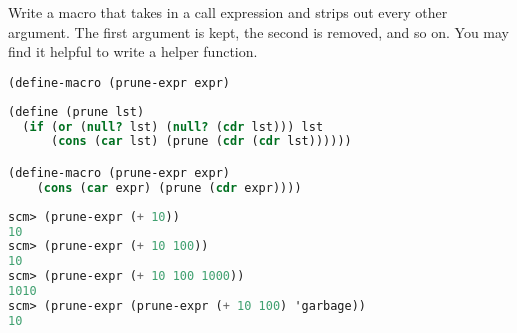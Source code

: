 \question Write a macro that takes in a call expression and strips out
every other argument. The first argument is kept, the second is removed,
and so on. You may find it helpful to write a helper function.

\begin{lstlisting}[language=Scheme]
(define-macro (prune-expr expr)
\end{lstlisting}

\begin{solution}[1.7in]
\begin{lstlisting}[language=Scheme]
(define (prune lst)
  (if (or (null? lst) (null? (cdr lst))) lst
      (cons (car lst) (prune (cdr (cdr lst))))))

(define-macro (prune-expr expr)
    (cons (car expr) (prune (cdr expr))))
\end{lstlisting}
\end{solution}

\begin{lstlisting}[language=Scheme]
scm> (prune-expr (+ 10))
10
scm> (prune-expr (+ 10 100))
10
scm> (prune-expr (+ 10 100 1000))
1010
scm> (prune-expr (prune-expr (+ 10 100) 'garbage))
10
\end{lstlisting}
